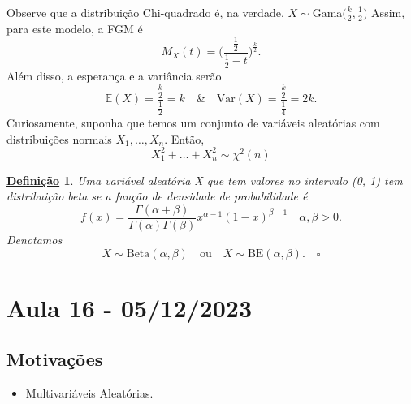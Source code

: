 \documentclass{article}
\newtheorem*{def*}{\underline{Defini\c c\~ao}}
\begin{document}
Observe que a distribuição Chi-quadrado é, na verdade, \(X\sim \mathrm{Gama}\biggl(\frac{k}{2}, \frac{1}{2}\biggr)\)
Assim, para este modelo, a FGM é 
\[
  M_{X}(t) = \biggl(\frac{\frac{1}{2}}{\frac{1}{2}-t}\biggr)^{\frac{k}{2}}.
\]
Além disso, a esperança e a variância serão 
\[
  \mathbb{E}(X) = \frac{\frac{k}{2}}{\frac{1}{2}} = k \quad\&\quad \mathrm{Var}(X) = \frac{\frac{k}{2}}{\frac{1}{4}} = 2k.
\]
Curiosamente, suponha que temos um conjunto de variáveis aleatórias com distribuições normais \(X_{1}, \dotsc , X_{n}\). Então, 
\[
  X_{1}^{2} + \dotsc + X_{n}^{2}\sim \chi^{2}(n) 
\]
\begin{def*}
  Uma variável aleatória X que tem valores no intervalo (0, 1) tem distribuição beta se a função de densidade de probabilidade é 
  \[
    f(x) = \frac{\Gamma (\alpha +\beta )}{\Gamma (\alpha )\Gamma (\beta )}x^{\alpha -1}(1-x)^{\beta -1}\quad \alpha , \beta > 0.
  \]
  Denotamos 
  \[
    X\sim \mathrm{Beta}(\alpha , \beta )\quad \text{ou}\quad X\sim \mathrm{BE}(\alpha , \beta ). \quad \square
  \]
\end{def*}
\newpage

\section{Aula 16 - 05/12/2023}
\subsection{Motivações}
\begin{itemize}
  \item Multivariáveis Aleatórias.
\end{itemize}
\end{document}
